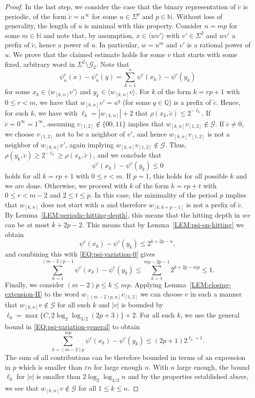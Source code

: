 \documentclass[11pt,reqno]{amsart}
\theoremstyle{plain}
\theoremstyle{definition}
\newcommand{\Q}{{\mathbb Q}}
\newcommand{\N}{{\mathbb N}}
\newcommand{\mc}{\mathcal}
\begin{document}
\begin{proof}
In the last step, we consider the case that the binary representation of $\breve{c}$ is periodic, of the form $\breve{c} = u^\infty$ for some $u \in \Sigma^p$ and $p \in \N$.
Without loss of generality, the length of $u$ is minimal with this property. Consider $n = mp$ for some $m \in \N$ and note that, by assumption, $x \in \langle w v' \rangle$ with $v' \in \Sigma^2$ and $wv'$ a prefix of $\breve{c}$, hence a power of $u$. 
In particular, $w=u^m$ and $v'$ is a rational power of $u$. We prove that the claimed estimate holds for some $v$ that starts with some fixed, arbitrary word in $\Sigma^2 \setminus \mc G_2$. 
Note that 
\[
\psi^c_n(x) - \psi^c_n(y) = \sum_{k=1}^n \psi^c(x_k) - \psi^c(y_k)
\]
for some $x_k \in \langle w_{[k,n]} v' \rangle$ and $y_k \in \langle w_{[k,n]} v \rangle$.
For $k$ of the form $k = rp+1$ with $0\leqslant r < m$, we have that $w_{[k,n]} v' = u^q$ (for some $q \in \Q$) is a prefix of $\breve{c}$. Hence, for such $k$, we have with $\ell_k = |w_{[k,n]}| + 2$ that $\rho(x_k,\breve{c}) \leqslant 2^{-\ell_k}$.
If $\breve{c} = 0^{\infty} = 1^{\infty}$, assuming $v_{[1,2]} \notin \{00,11\}$ implies that $w_{[k,n]} v_{[1,2]} \notin \mc G$.
If $\breve{c} \neq 0$, we choose $v_{[1,2]}$  not to be a neighbor of $v'$, and hence $w_{[k,n]} v_{[1,2]}$ is not a neighbor of $w_{[k,n]}v'$, again implying $w_{[k,n]}v_{[1,2]} \notin \mc G$. Thus, $\rho(y_k,\breve{c}) \geqslant 2^{-\ell_k} \geqslant \rho(x_k,\breve{c})$, and we conclude that
\begin{equation}
\label{EQ:psi-variation-0}
\psi^c(x_k) - \psi^c(y_k) \leqslant 0
\end{equation}
holds for all $k=rp + 1$ with $0 \leqslant r < m$.
If $p=1$, this holds for all possible $k$ and we are done. Otherwise, we proceed with $k$ of the form $k = rp+ t$ with $0 \leqslant r < m-2$ and $2\leqslant t \leqslant p$. 
In this case, the minimality of the period $p$ implies that $w_{[k,n]}$ does not start with $u$ and therefore $w_{[k,k+p-1]}$ is not a prefix of $\breve{c}$. By Lemma~\ref{LEM:periodic-hitting-depth}, this means that the hitting depth in $wv$ can be at most $k+2p-2$. 
This means that by Lemma~\ref{LEM:psi-on-hitting} we obtain
\[
\psi^c(x_k) - \psi^c(y_k) \leqslant 2^{k+2p -n},
\]
and combining this with \eqref{EQ:psi-variation-0}
gives
\[
\sum_{k=1}^{(m-2)p - 1} \psi^c(x_k) - \psi^c(y_k)
\leqslant \sum_{k=1}^{mp - 2p - 1} 2^{k+2p -mp} \leqslant 1.
\]
Finally, we consider $(m-2)p \leqslant k \leqslant mp$. Applying Lemma~\ref{LEM:closing-extension-II} to the word $w_{[(m-2)p,n]} v_{[1,2]}$ we can choose $v$ in such a manner that $w_{[k,n]} v \notin \mc G$ for all such $k$ and $|v|$ is bounded by $\ell_0 = \max \{ C ,2\log_2 \log_{3/2} (2p + 3) \} + 2$. 
For all such $k$, we use the general bound in \eqref{EQ:psi-variation-general} to obtain
\[
\sum_{k = (m-2)p}^{mp} \psi^c(x_k) - \psi^c(y_k)
\leqslant (2p + 1) 2^{\ell_0 + 1}.
\]
The sum of all contributions can be therefore bounded in terms of an expression in $p$ which is smaller than $\varepsilon n$ for large enough $n$.
With $n$ large enough, the bound $\ell_0$ for $|v|$ is smaller than $2 \log_2 \log_{3/2} n$ and by the properties established above, we see that $w_{[k,n]}v \notin \mc G$ for all $1\leqslant k \leqslant n$.
\end{proof}
\end{document}
